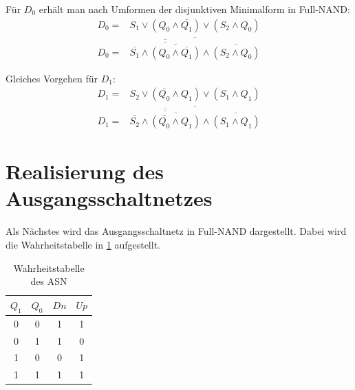 \documentclass[
    paper=a4,
]{scrartcl}
\begin{document}
    Für \(D_0\) erhält man nach Umformen der disjunktiven Minimalform in Full-NAND:
    \begin{align*}
        D_0 =& S_1 \vee (Q_0 \wedge \overline{Q_1}) \vee (S_2 \wedge Q_0)\\
        D_0 =& \overline{ \overline{\overline{\overline{S_1} \wedge \overline{ (Q_0 \wedge \overline{Q_1}) } }} \wedge \overline{ (S_2 \wedge Q_0) }}
    \end{align*}

    Gleiches Vorgehen für \(D_1\):
    \begin{align*}
        D_1 =& S_2 \vee (\overline{Q_0} \wedge Q_1) \vee (S_1 \wedge Q_1)\\
        D_1 =& \overline{ \overline{\overline{\overline{S_2} \wedge \overline{ (\overline{Q_0} \wedge Q_1) }}} \wedge \overline{ (S_1 \wedge Q_1) }}
    \end{align*}
    
\section{Realisierung des Ausgangsschaltnetzes}
    Als Nächstes wird das Ausgangsschaltnetz in Full-NAND dargestellt. Dabei wird die Wahrheitstabelle in \ref{tab:5} aufgestellt.

    \begin{table}
        \centering
        \caption{Wahrheitstabelle des ASN}
        \label{tab:5}
        \begin{tabular}{cc|cc}\toprule
            $Q_1$   &   $Q_0$   &   $Dn$    &   $Up$\\\midrule
            0       &   0       &   1       &   1\\
            0       &   1       &   1       &   0\\
            1       &   0       &   0       &   1\\
            1       &   1       &   1       &   1\\\bottomrule
        \end{tabular}
    \end{table}
\end{document}
